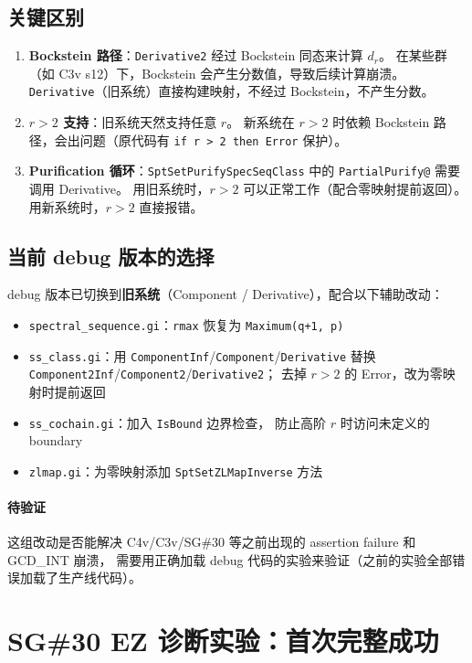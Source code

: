 \documentclass[a4paper,fontset=ubuntu,12pt]{ctexart}
\begin{document}
\subsection{关键区别}
\begin{enumerate}
\item \textbf{Bockstein 路径}：\texttt{Derivative2} 经过 Bockstein 同态来计算 $d_r$。
      在某些群（如 C3v s12）下，Bockstein 会产生分数值，导致后续计算崩溃。
      \texttt{Derivative}（旧系统）直接构建映射，不经过 Bockstein，不产生分数。
\item \textbf{$r > 2$ 支持}：旧系统天然支持任意 $r$。
      新系统在 $r > 2$ 时依赖 Bockstein 路径，会出问题（原代码有 \texttt{if r > 2 then Error} 保护）。
\item \textbf{Purification 循环}：\texttt{SptSetPurifySpecSeqClass} 中的
      \texttt{PartialPurify@} 需要调用 Derivative。
      用旧系统时，$r > 2$ 可以正常工作（配合零映射提前返回）。
      用新系统时，$r > 2$ 直接报错。
\end{enumerate}

\subsection{当前 debug 版本的选择}
debug 版本已切换到\textbf{旧系统}（Component / Derivative），配合以下辅助改动：
\begin{itemize}
\item \texttt{spectral\_sequence.gi}：\texttt{rmax} 恢复为 \texttt{Maximum(q+1, p)}
\item \texttt{ss\_class.gi}：用 \texttt{ComponentInf}/\texttt{Component}/\texttt{Derivative}
      替换 \texttt{Component2Inf}/\texttt{Component2}/\texttt{Derivative2}；
      去掉 $r > 2$ 的 Error，改为零映射时提前返回
\item \texttt{ss\_cochain.gi}：加入 \texttt{IsBound} 边界检查，
      防止高阶 $r$ 时访问未定义的 boundary
\item \texttt{zlmap.gi}：为零映射添加 \texttt{SptSetZLMapInverse} 方法
\end{itemize}

\paragraph{待验证}
这组改动是否能解决 C4v/C3v/SG\#30 等之前出现的 assertion failure 和 GCD\_INT 崩溃，
需要用正确加载 debug 代码的实验来验证（之前的实验全部错误加载了生产线代码）。

\section{SG\#30 EZ 诊断实验：首次完整成功}
\label{sec:sg30-ez-success}
\end{document}
